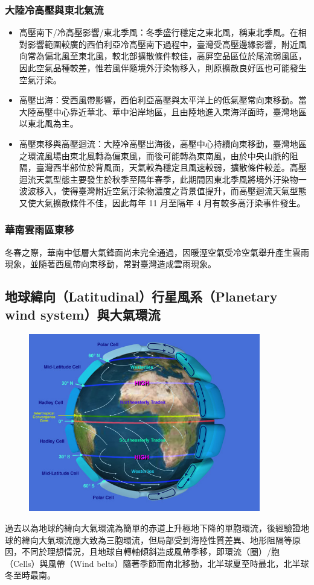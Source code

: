 \documentclass[a4paper,12pt]{report}
\begin{document}
\begin{itemize}
\subsubsection{大陸冷高壓與東北氣流}
\begin{itemize}
  \item 高壓南下/冷高壓影響/東北季風：冬季盛行穩定之東北風，稱東北季風。在相對影響範圍較廣的西伯利亞冷高壓南下過程中，臺灣受高壓邊緣影響，附近風向常為偏北風至東北風，較北部擴散條件較佳，高屏空品區位於尾流弱風區，因此空氣品種較差，惟若風伴隨境外汙染物移入，則原擴散良好區也可能發生空氣汙染。
  \item 高壓出海：受西風帶影響，西伯利亞高壓與太平洋上的低氣壓常向東移動。當大陸高壓中心靠近華北、華中沿岸地區，且由陸地進入東海洋面時，臺灣地區以東北風為主。
  \item 高壓東移與高壓迴流：大陸冷高壓出海後，高壓中心持續向東移動，臺灣地區之環流風場由東北風轉為偏東風，而後可能轉為東南風，由於中央山脈的阻隔，臺灣西半部位於背風面，天氣較為穩定且風速較弱，擴散條件較差。高壓迴流天氣型態主要發生於秋季至隔年春季，此期間因東北季風將境外汙染物一波波移入，使得臺灣附近空氣汙染物濃度之背景值提升，而高壓迴流天氣型態又使大氣擴散條件不佳，因此每年 11 月至隔年 4 月有較多高汙染事件發生。
\end{itemize}
\subsubsection{華南雲雨區東移}
冬春之際，華南中低層大氣鋒面尚未完全通過，因暖溼空氣受冷空氣舉升產生雲雨現象，並隨著西風帶向東移動，常對臺灣造成雲雨現象。
\subsection{地球緯向（Latitudinal）行星風系（Planetary wind system）與大氣環流}
\bct\begin{figure}[H]
    \centering
    \includegraphics[width=0.9\textwidth]{circulation.jpg}
\end{figure}\FB\ect
過去以為地球的緯向大氣環流為簡單的赤道上升極地下降的單胞環流，後經驗證地球的緯向大氣環流應大致為三胞環流，但局部受到海陸性質差異、地形阻隔等原因，不同於理想情況，且地球自轉軸傾斜造成風帶季移，即環流（圈）/胞（Cells）與風帶（Wind belts）隨著季節而南北移動，北半球夏至時最北，北半球冬至時最南。


\end{itemize}
\end{document}
